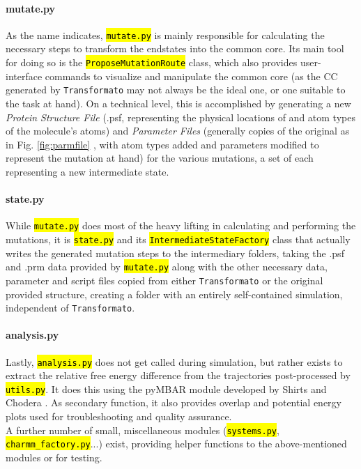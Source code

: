 \documentclass[oneside]{scrreprt}
\newcommand{\code}[1]{\texttt{\hl{#1}}}
\begin{document}
\paragraph{mutate.py}
As the name indicates, \code{mutate.py} is mainly responsible for calculating the necessary steps to transform the endstates into the common core. Its main tool for doing so is the \code{ProposeMutationRoute} class, which also provides user-interface commands to visualize and manipulate the common core (as the CC generated by \texttt{Transformato} may not always be the ideal one, or one suitable to the task at hand). On a technical level, this is accomplished by generating a new \textit{Protein Structure File} (.psf, representing the physical locations of and atom types of the molecule's atoms) and \textit{Parameter Files} (generally copies of the original as in Fig. \ref{fig:parmfile} , with atom types added and parameters modified to represent the mutation at hand) for the various mutations, a set of each representing a new intermediate state.
\paragraph{state.py}
While \code{mutate.py} does most of the heavy lifting in calculating and performing the mutations, it is \code{state.py} and its \code{IntermediateStateFactory} class that actually writes the generated mutation steps to the intermediary folders, taking the .psf and .prm data provided by \code{mutate.py} along with the other necessary data, parameter and script files copied from either \texttt{Transformato} or the original provided structure, creating a folder with an entirely self-contained simulation, independent of \texttt{Transformato}.
\paragraph{analysis.py}
Lastly, \code{analysis.py} does not get called during simulation, but rather exists to extract the relative free energy difference from the trajectories post-processed by \code{utils.py}. It does this using the pyMBAR module developed by Shirts and Chodera \cite{shirts_statistically_2008,Shirts2016Sep}. As secondary function, it also provides overlap and potential energy plots used for troubleshooting and quality assurance.\\

A further number of small, miscellaneous modules (\code{systems.py}, \code{charmm\_factory.py}...) exist, providing helper functions to the above-mentioned modules or for testing.
\end{document}
